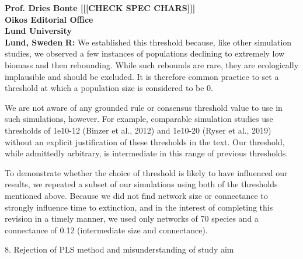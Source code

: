 \documentclass[12pt]{letter}
\begin{document}
\begin{letter}{\bf Prof. Dries Bonte [[[CHECK SPEC CHARS]]]\\
Oikos Editorial Office \\
Lund University \\
Lund, Sweden}
      \textbf{R:} We established this threshold because, like other simulation studies, we observed a few instances of populations declining to extremely low biomass and then rebounding. While such rebounds are rare, they are ecologically implausible and should be excluded. It is therefore common practice to set a threshold at which a population size is considered to be 0.
      
      
      We are not aware of any grounded rule or consensus threshold value to use in such simulations, however. For example, comparable simulation studies use thresholds of 1e10-12 (Binzer et al., 2012) and 1e10-20 (Ryser et al., 2019) without an explicit justification of these thresholds in the text. Our threshold, while admittedly arbitrary, is intermediate in this range of previous thresholds.
      
      
      To demonstrate whether the choice of threshold is likely to have influenced our results, we repeated a subset of our simulations using both of the thresholds mentioned above. Because we did not find network size or connectance to strongly influence time to extinction, and in the interest of completing this revision in a timely manner, we used only networks of 70 species and a connectance of 0.12 (intermediate size and connectance).



    8. Rejection of PLS method and misunderstanding of study aim


\end{letter}
\end{document}

